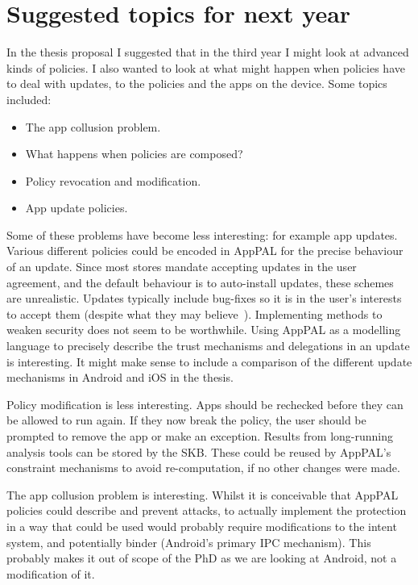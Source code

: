 \documentclass[a4paper]{scrartcl}
\begin{document}
\section{Suggested topics for next year}
\label{sec:futurework}

In the thesis proposal I suggested that in the third year I might look at advanced kinds of policies.
I also wanted to look at what might happen when policies have to deal with updates, to the policies and the apps on the device.
Some topics included:
\begin{itemize}
  \item The app collusion problem.
  \item What happens when policies are composed?
  \item Policy revocation and modification.
  \item App update policies.
\end{itemize}

Some of these problems have become less interesting: for example app updates.
Various different policies could be encoded in AppPAL for the precise behaviour of an update.
Since most stores mandate accepting updates in the user agreement, and the default behaviour is to auto-install updates, these schemes are unrealistic.
Updates typically include bug-fixes so it is in the user's interests to accept them (despite what they may believe~\citep{Vaniea:2014fk}).
Implementing methods to weaken security does not seem to be worthwhile.
Using AppPAL as a modelling language to precisely describe the trust mechanisms and delegations in an update is interesting.
It might make sense to include a comparison of the different update mechanisms in Android and iOS in the thesis.

Policy modification is less interesting.
Apps should be rechecked before they can be allowed to run again.
If they now break the policy, the user should be prompted to remove the app or make an exception.
Results from long-running analysis tools can be stored by the \ac{SKB}.
These could be reused by AppPAL's constraint mechanisms to avoid re-computation, if no other changes were made.

The app collusion problem is interesting.
Whilst it is conceivable that AppPAL policies could describe and prevent attacks, to actually implement the protection in a way that could be used would probably require modifications to the intent system, and potentially binder (Android's primary IPC mechanism).
This probably makes it out of scope of the PhD as we are looking at Android, not a modification of it.
\end{document}
